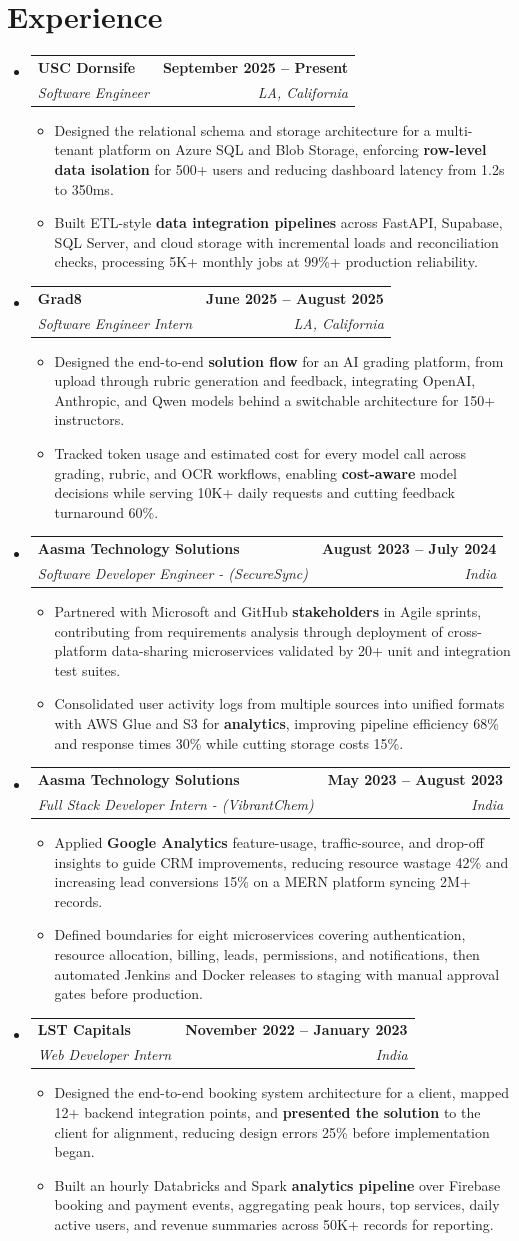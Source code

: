 \documentclass[letterpaper,10pt]{article}
\makeatletter
\newcommand{\itemTail}{\vspace{-4pt}}
\newcommand{\sectionGap}{\vspace{-8pt}}
\newcommand{\roleGap}{\vspace{2pt}}
\newcommand{\resumeItem}[1]{\item\small{{#1 \itemTail}}}
\newcommand{\resumeSubheading}[4]{\vspace{-1pt}\item\begin{tabular*}{1.0\textwidth}[t]{l@{\extracolsep{\fill}}r}\textbf{#1} & \textbf{\small #2} \\\textit{\small#3} & \textit{\small #4} \\\end{tabular*}\vspace{-2pt}}
\newcommand{\resumeSubHeadingListStart}{\begin{itemize}[leftmargin=0.0in, label={}]}
\newcommand{\resumeSubHeadingListEnd}{\end{itemize}}
\newcommand{\resumeItemListStart}{\begin{itemize}[leftmargin=0.15in,label=\textbullet,itemsep=3pt,topsep=0pt,parsep=0pt,partopsep=0pt]}
\newcommand{\resumeItemListEnd}{\end{itemize}\vspace{-4pt}}
\makeatother
\begin{document}
\section{Experience}
\resumeSubHeadingListStart
\resumeSubheading{USC Dornsife}{September 2025 -- Present}{Software Engineer}{LA, California}
\resumeItemListStart
\resumeItem{Designed the relational schema and storage architecture for a multi-tenant platform on Azure SQL and Blob Storage, enforcing \textbf{row-level data isolation} for 500+ users and reducing dashboard latency from 1.2s to 350ms.}
\resumeItem{Built ETL-style \textbf{data integration pipelines} across FastAPI, Supabase, SQL Server, and cloud storage with incremental loads and reconciliation checks, processing 5K+ monthly jobs at 99\%+ production reliability.}
\resumeItemListEnd
\roleGap
\resumeSubheading{Grad8}{June 2025 -- August 2025}{Software Engineer Intern}{LA, California}
\resumeItemListStart
\resumeItem{Designed the end-to-end \textbf{solution flow} for an AI grading platform, from upload through rubric generation and feedback, integrating OpenAI, Anthropic, and Qwen models behind a switchable architecture for 150+ instructors.}
\resumeItem{Tracked token usage and estimated cost for every model call across grading, rubric, and OCR workflows, enabling \textbf{cost-aware} model decisions while serving 10K+ daily requests and cutting feedback turnaround 60\%.}
\resumeItemListEnd
\roleGap
\resumeSubheading{Aasma Technology Solutions}{August 2023 -- July 2024}{Software Developer Engineer - (SecureSync)}{India}
\resumeItemListStart
\resumeItem{Partnered with Microsoft and GitHub \textbf{stakeholders} in Agile sprints, contributing from requirements analysis through deployment of cross-platform data-sharing microservices validated by 20+ unit and integration test suites.}
\resumeItem{Consolidated user activity logs from multiple sources into unified formats with AWS Glue and S3 for \textbf{analytics}, improving pipeline efficiency 68\% and response times 30\% while cutting storage costs 15\%.}
\resumeItemListEnd
\roleGap
\resumeSubheading{Aasma Technology Solutions}{May 2023 -- August 2023}{Full Stack Developer Intern - (VibrantChem)}{India}
\resumeItemListStart
\resumeItem{Applied \textbf{Google Analytics} feature-usage, traffic-source, and drop-off insights to guide CRM improvements, reducing resource wastage 42\% and increasing lead conversions 15\% on a MERN platform syncing 2M+ records.}
\resumeItem{Defined boundaries for eight microservices covering authentication, resource allocation, billing, leads, permissions, and notifications, then automated Jenkins and Docker releases to staging with manual approval gates before production.}
\resumeItemListEnd
\roleGap
\resumeSubheading{LST Capitals}{November 2022 -- January 2023}{Web Developer Intern}{India}
\resumeItemListStart
\resumeItem{Designed the end-to-end booking system architecture for a client, mapped 12+ backend integration points, and \textbf{presented the solution} to the client for alignment, reducing design errors 25\% before implementation began.}
\resumeItem{Built an hourly Databricks and Spark \textbf{analytics pipeline} over Firebase booking and payment events, aggregating peak hours, top services, daily active users, and revenue summaries across 50K+ records for reporting.}
\resumeItemListEnd
\resumeSubHeadingListEnd
\sectionGap
\end{document}
